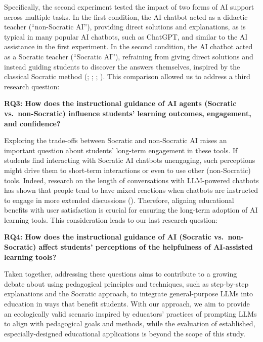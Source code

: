 \documentclass[
  11pt,
]{article}
\begin{document}
Specifically, the second experiment tested the impact of two forms of AI support across multiple tasks. In the first condition, the AI chatbot acted as a didactic teacher (``non-Socratic AI''), providing direct solutions and explanations, as is typical in many popular AI chatbots, such as ChatGPT, and similar to the AI assistance in the first experiment. In the second condition, the AI chatbot acted as a Socratic teacher (``Socratic AI''), refraining from giving direct solutions and instead guiding students to discover the answers themselves, inspired by the classical Socratic method (; ; ; ). This comparison allowed us to address a third research question:

\textbf{RQ3: How does the instructional guidance of AI agents (Socratic vs.~non-Socratic) influence students' learning outcomes, engagement, and confidence?}

Exploring the trade-offs between Socratic and non-Socratic AI raises an important question about students' long-term engagement in these tools. If students find interacting with Socratic AI chatbots unengaging, such perceptions might drive them to short-term interactions or even to use other (non-Socratic) tools. Indeed, research on the length of conversations with LLM-powered chatbots has shown that people tend to have mixed reactions when chatbots are instructed to engage in more extended discussions (). Therefore, aligning educational benefits with user satisfaction is crucial for ensuring the long-term adoption of AI learning tools. This consideration leads to our last research question:

\textbf{RQ4: How does the instructional guidance of AI (Socratic vs.~non-Socratic) affect students' perceptions of the helpfulness of AI-assisted learning tools?}

Taken together, addressing these questions aims to contribute to a growing debate about using pedagogical principles and techniques, such as step-by-step explanations and the Socratic approach, to integrate general-purpose LLMs into education in ways that benefit students. With our approach, we aim to provide an ecologically valid scenario inspired by educators' practices of prompting LLMs to align with pedagogical goals and methods, while the evaluation of established, especially-designed educational applications is beyond the scope of this study.
\end{document}
